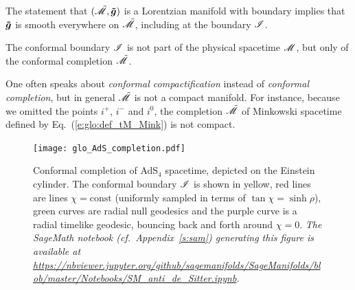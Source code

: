 \begin{remark}
The statement that $(\tilde{\mathscr{M}},\bm{\tilde{g}})$ is a Lorentzian manifold with
boundary implies that $\bm{\tilde{g}}$ is smooth everywhere on $\tilde{\mathscr{M}}$,
including at the boundary $\mathscr{I}$.
\end{remark}

\begin{remark}
The conformal boundary $\mathscr{I}$ is not part of the physical spacetime
$\mathscr{M}$, but only of the conformal completion $\tilde{\mathscr{M}}$.
\end{remark}

\begin{remark}
One often speaks about
\emph{conformal compactification}
instead of \emph{conformal completion}, but in general $\tilde{\mathscr{M}}$ is not a
compact manifold. For instance, because we omitted the points $i^+$, $i^-$ and $i^0$,
the completion $\tilde{\mathscr{M}}$ of Minkowski spacetime defined by Eq.~(\ref{e:glo:def_tM_Mink})
is not compact.
\end{remark}

\begin{figure}
\centerline{\texttt{[image: glo\_AdS\_completion.pdf]}}
\caption[]{\label{f:glo:AdS_completion} \footnotesize
Conformal completion of AdS$_{4}$ spacetime, depicted on the Einstein cylinder.
The conformal boundary $\mathscr{I}$ is shown in yellow, red lines are lines
$\chi=\mathrm{const}$ (uniformly sampled in terms of $\tan\chi = \sinh\rho$),
green curves are radial null geodesics and the purple curve
is a radial timelike geodesic, bouncing back and forth around $\chi=0$.
\textsl{The SageMath notebook (cf.~Appendix~\ref{s:sam}) generating this figure
is available at {\scriptsize \url{https://nbviewer.jupyter.org/github/sagemanifolds/SageManifolds/blob/master/Notebooks/SM_anti_de_Sitter.ipynb}}.}}
\end{figure}

